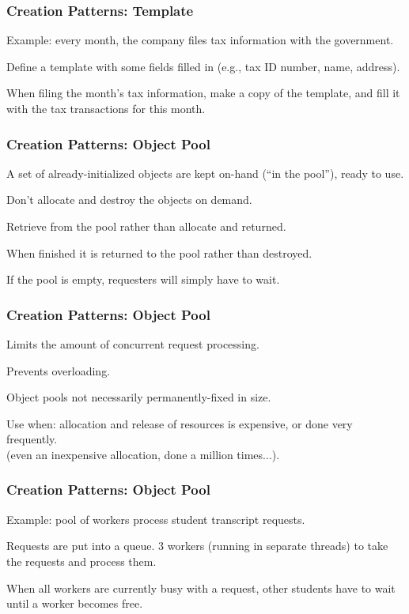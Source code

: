 \begin{frame}
\frametitle{Creation Patterns: Template}
\begin{changemargin}{1cm}

Example: every month, the company files tax information with the government. 

Define a template with some fields filled in (e.g., tax ID number, name, address). 

When filing the month's tax information, make a copy of the template, and fill it with the tax transactions for this month.

\end{changemargin}
\end{frame}

\begin{frame}
\frametitle{Creation Patterns: Object Pool}
\begin{changemargin}{1cm}

A set of already-initialized objects are kept on-hand (``in the pool''), ready to use.

Don't allocate and destroy the objects on demand. 

Retrieve from the pool rather than allocate and returned.

When finished it is returned to the pool rather than destroyed. 

If the pool is empty, requesters will simply have to wait.

\end{changemargin}
\end{frame}


\begin{frame}
\frametitle{Creation Patterns: Object Pool}
\begin{changemargin}{1cm}

Limits the amount of concurrent request processing.

Prevents overloading.

Object pools not necessarily permanently-fixed in size.

Use when: allocation and release of resources is expensive, or done very frequently.\\
\quad (even an inexpensive allocation, done a million times...).

\end{changemargin}
\end{frame}

\begin{frame}
\frametitle{Creation Patterns: Object Pool}
\begin{changemargin}{1cm}

Example: pool of workers process student transcript requests. 

Requests are put into a queue. 3 workers (running in separate threads) to take the requests and process them. 

When all workers are currently busy with a request, other students have to wait until a worker becomes free. 
\end{changemargin}
\end{frame}

